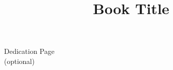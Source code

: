\documentclass{psp-book9x6}
\title{Book Title}
\begin{document}
\titlepages                       

\begin{dedication}
\large Dedication Page \\[13pt]
\large (optional)
\end{dedication}

                 
%               
%        
\tableofcontents



\setcounter{page}{1}




%

    
      

\printindex
\end{document}
